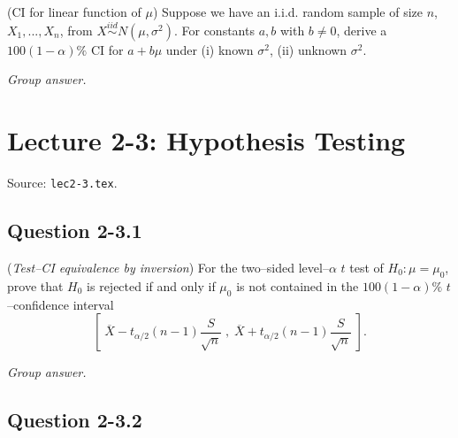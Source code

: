 \documentclass[11pt,letterpaper]{article}
\newenvironment{groupanswer}
  {\par\smallskip\noindent\textit{Group answer.}\par\nopagebreak\smallskip}
  {\par\medskip}
\begin{document}
\label{q:lec2-2-3}


(CI for linear function of $\mu$) Suppose we have an i.i.d. random sample of size $n$, $X_1,...,X_n$, from $X \stackrel{iid}{\sim} N(\mu,\sigma^2)$. For constants $a,b$ with $b\neq0$, derive a $100(1-\alpha)\%$ CI for $a+b\mu$ under (i) known $\sigma^2$, (ii) unknown $\sigma^2$.


\begin{groupanswer}
\vspace{\baselineskip}
\end{groupanswer}

\clearpage

\section*{Lecture 2-3: Hypothesis Testing}

{\small Source: \texttt{lec2-3.tex}.}


\subsection*{Question 2-3.1}

\label{q:lec2-3-1}


(\emph{Test–CI equivalence by inversion})
For the two–sided level–$\alpha$ $t$ test of $H_0:\mu=\mu_0$, prove that $H_0$ is rejected if and only if $\mu_0$ is not contained in the $100(1-\alpha)\%$ $t$–confidence interval
\[
\left[\;\overline{X}-t_{\alpha/2}(n-1)\frac{S}{\sqrt{n}}\;,\;\overline{X}+t_{\alpha/2}(n-1)\frac{S}{\sqrt{n}}\;\right].
\]


\begin{groupanswer}
\vspace{\baselineskip}
\end{groupanswer}


\subsection*{Question 2-3.2}
\end{document}
